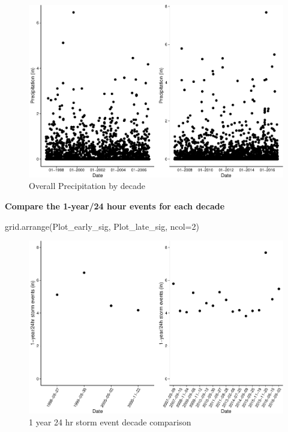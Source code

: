 \documentclass[
  12pt,
]{article}
\newenvironment{Shaded}{\begin{snugshade}}{\end{snugshade}}
\newcommand{\AttributeTok}[1]{\textcolor[rgb]{0.77,0.63,0.00}{#1}}
\newcommand{\DecValTok}[1]{\textcolor[rgb]{0.00,0.00,0.81}{#1}}
\newcommand{\FunctionTok}[1]{\textcolor[rgb]{0.00,0.00,0.00}{#1}}
\newcommand{\NormalTok}[1]{#1}
\begin{document}
\begin{figure}

{\centering \includegraphics{Final_Project_Thornton_Katayama_Ngenzi_files/figure-latex/overall grid-1} 

}

\caption{Overall Precipitation by decade}\label{fig:overall grid}
\end{figure}
\newpage

\textbf{Compare the 1-year/24 hour events for each decade}

\begin{Shaded}
\begin{Highlighting}[]
\FunctionTok{grid.arrange}\NormalTok{(Plot\_early\_sig, Plot\_late\_sig, }\AttributeTok{ncol=}\DecValTok{2}\NormalTok{)}
\end{Highlighting}
\end{Shaded}

\begin{figure}

{\centering \includegraphics{Final_Project_Thornton_Katayama_Ngenzi_files/figure-latex/combined one year storms-1} 

}

\caption{1 year 24 hr storm event decade comparison}\label{fig:combined one year storms}
\end{figure}
\end{document}
